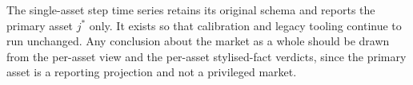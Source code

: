 \documentclass[12pt, a4paper]{article}
\begin{document}
    The single-asset step time series retains its original schema and reports the
    primary asset \(j^{\ast}\) only. It exists so that calibration and legacy
    tooling continue to run unchanged. Any conclusion about the market as a whole
    should be drawn from the per-asset view and the per-asset stylised-fact
    verdicts, since the primary asset is a reporting projection and not a
    privileged market.
\end{document}
